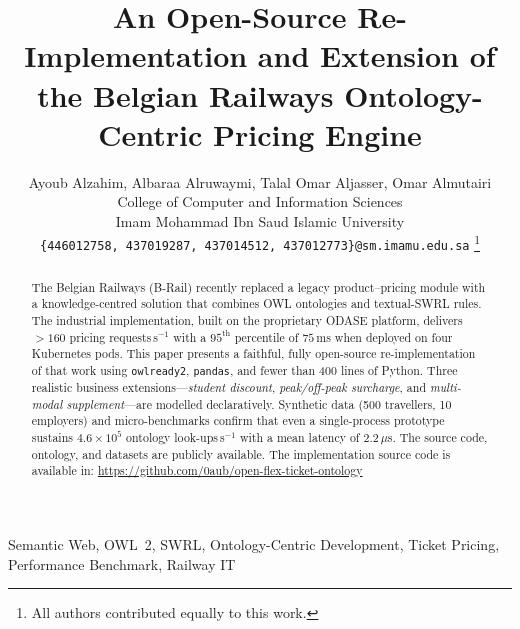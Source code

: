 \documentclass[lettersize,journal]{IEEEtran}
\begin{document}
\title{An Open-Source Re-Implementation and Extension of the Belgian Railways Ontology-Centric Pricing Engine}

\author{%
Ayoub Alzahim, Albaraa Alruwaymi, Talal Omar Aljasser, Omar Almutairi\\
College of Computer and Information Sciences\\
Imam Mohammad Ibn Saud Islamic University\\
\texttt{\{446012758, 437019287, 437014512, 437012773\}@sm.imamu.edu.sa}%
\thanks{All authors contributed equally to this work.}
}


\maketitle

\begin{abstract}
\boldmath
The Belgian Railways (B-Rail) recently replaced a legacy product–pricing module with a knowledge-centred solution that combines OWL ontologies and textual-SWRL rules.  
The industrial implementation, built on the proprietary ODAS\!E platform, delivers $>160$ pricing requests\,s$^{-1}$ with a $95^{\text{th}}$ percentile of $75$\,ms when deployed on four Kubernetes pods.  
This paper presents a faithful, fully open-source re-implementation of that work using \texttt{owlready2}, \texttt{pandas}, and fewer than 400 lines of Python.  
Three realistic business extensions—\emph{student discount}, \emph{peak/off-peak surcharge}, and \emph{multi-modal supplement}—are modelled declaratively.  
Synthetic data (500 travellers, 10 employers) and micro-benchmarks confirm that even a single-process prototype sustains \mbox{$4.6\times10^{5}$} ontology look-ups\,s$^{-1}$ with a mean latency of $2.2\,\mu$s.  
The source code, ontology, and datasets are publicly available. The implementation source code is available in: \url{https://github.com/0aub/open-flex-ticket-ontology}
\end{abstract}

\begin{IEEEkeywords}
Semantic Web, OWL~2, SWRL, Ontology-Centric Development, Ticket Pricing, Performance Benchmark, Railway IT
\end{IEEEkeywords}

\end{document}
